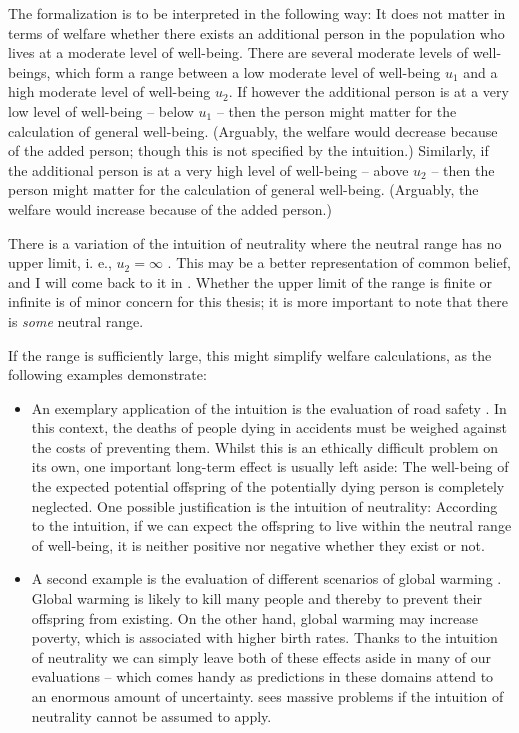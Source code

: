 The formalization is to be interpreted in the following way: It does not matter in terms of welfare whether there exists an additional person in the population who lives at a moderate level of well-being. There are several moderate levels of well-beings, which form a range between a low moderate level of well-being $u_1$ and a high moderate level of well-being $u_2$. If however the additional person is at a very low level of well-being – below $u_1$ – then the person might matter for the calculation of general well-being. (Arguably, the welfare would decrease because of the added person; though this is not specified by the intuition.) Similarly, if the additional person is at a very high level of well-being – above $u_2$ – then the person might matter for the calculation of general well-being. (Arguably, the welfare would increase because of the added person.) 

There is a variation of the intuition of neutrality where the neutral range has no upper limit, i. e., $u_2=\infty$ \cite[p.~113]{broome_2012}. This may be a better representation of common belief, and I will come back to it in . Whether the upper limit of the range is finite or infinite is of minor concern for this thesis; it is more important to note that there is \emph{some} neutral range. 

If the range is sufficiently large, this might simplify welfare calculations, as the following examples demonstrate:

\begin{itemize}
\item An exemplary application of the intuition is the evaluation of road safety \cite[p.~144f]{broome_2004}. In this context, the deaths of people dying in accidents must be weighed against the costs of preventing them. Whilst this is an ethically difficult problem on its own, one important long-term effect is usually left aside: The well-being of the expected potential offspring of the potentially dying person is completely neglected. One possible justification is the intuition of neutrality: According to the intuition, if we can expect the offspring to live within the neutral range of well-being, it is neither positive nor negative whether they exist or not.
\item A second example is the evaluation of different scenarios of global warming \cite[p.~170]{broome_2012}. Global warming is likely to kill many people and thereby to prevent their offspring from existing. On the other hand, global warming may increase poverty, which is associated with higher birth rates. Thanks to the intuition of neutrality we can simply leave both of these effects aside in many of our evaluations – which comes handy as predictions in these domains attend to an enormous amount of uncertainty.  sees massive problems if the intuition of neutrality cannot be assumed to apply.
\end{itemize}


